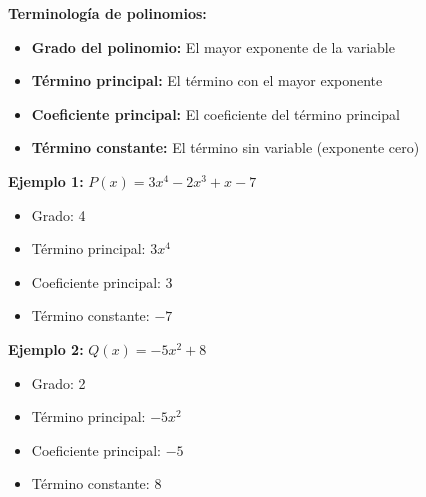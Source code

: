 \textbf{Terminología de polinomios:}
\begin{itemize}
\item \textbf{Grado del polinomio:} El mayor exponente de la variable
\item \textbf{Término principal:} El término con el mayor exponente
\item \textbf{Coeficiente principal:} El coeficiente del término principal
\item \textbf{Término constante:} El término sin variable (exponente cero)
\end{itemize}

\begin{example}
\textbf{Ejemplo 1:} $P(x) = 3x^4 - 2x^3 + x - 7$
\begin{itemize}
\item Grado: 4
\item Término principal: $3x^4$
\item Coeficiente principal: 3
\item Término constante: $-7$
\end{itemize}

\noindent \textbf{Ejemplo 2:} $Q(x) = -5x^2 + 8$
\begin{itemize}
\item Grado: 2
\item Término principal: $-5x^2$
\item Coeficiente principal: $-5$
\item Término constante: 8
\end{itemize}
\end{example}


